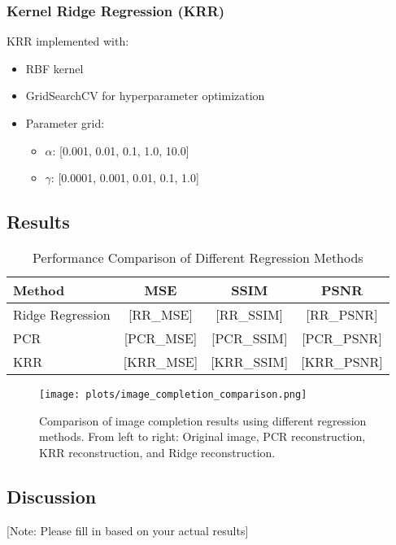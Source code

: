 \subsubsection{Kernel Ridge Regression (KRR)}
KRR implemented with:
\begin{itemize}
    \item RBF kernel
    \item GridSearchCV for hyperparameter optimization
    \item Parameter grid:
        \begin{itemize}
            \item $\alpha$: [0.001, 0.01, 0.1, 1.0, 10.0]
            \item $\gamma$: [0.0001, 0.001, 0.01, 0.1, 1.0]
        \end{itemize}
\end{itemize}

\subsection{Results}

\begin{table}[h]
\centering
\caption{Performance Comparison of Different Regression Methods}
\begin{tabular}{|l|c|c|c|}
\hline
\textbf{Method} & \textbf{MSE} & \textbf{SSIM} & \textbf{PSNR} \\
\hline
Ridge Regression & [RR_MSE] & [RR_SSIM] & [RR_PSNR] \\
PCR & [PCR_MSE] & [PCR_SSIM] & [PCR_PSNR] \\
KRR & [KRR_MSE] & [KRR_SSIM] & [KRR_PSNR] \\
\hline
\end{tabular}
\end{table}

\begin{figure}[h]
\centering
\texttt{[image: plots/image\_completion\_comparison.png]}
\caption{Comparison of image completion results using different regression methods. From left to right: Original image, PCR reconstruction, KRR reconstruction, and Ridge reconstruction.}
\label{fig:completion_comparison}
\end{figure}

\subsection{Discussion}
[Note: Please fill in based on your actual results]

